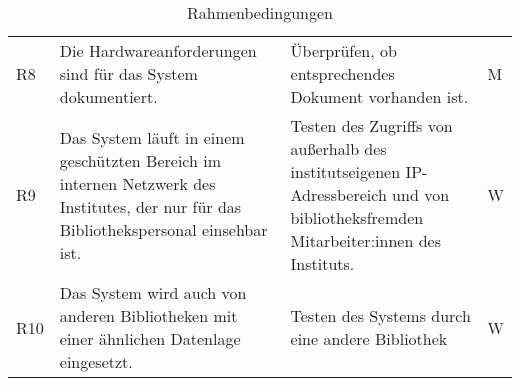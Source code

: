 \begin{table}[h]
\begin{adjustbox}{max width=\textwidth}
\begin{tabular}{lp{7.5cm}p{7.5cm}l}
        R8                                &Die Hardwareanforderungen sind für das System dokumentiert. & Überprüfen, ob entsprechendes Dokument vorhanden ist.  & M\\
        R9                               &Das System läuft in einem geschützten Bereich im internen Netzwerk des Institutes, der nur für das Bibliothekspersonal einsehbar ist. & Testen des Zugriffs von außerhalb des institutseigenen IP-Adressbereich und von bibliotheksfremden Mitarbeiter:innen des Instituts.& W\\
        R10                               &Das System wird auch von anderen Bibliotheken mit einer ähnlichen Datenlage eingesetzt. & Testen des Systems durch eine andere Bibliothek & W\\
       \bottomrule
    \end{tabular}
    \end{adjustbox}
    \caption{%
        Rahmenbedingungen
    }
    \label{tab:Rahmenbedingungen}
    \end{table}
\endgroup







